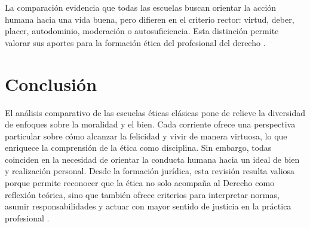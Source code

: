 \documentclass[
	spanish, %
	letterpaper, oneside
]{article}
\begin{document}
La comparación evidencia que todas las escuelas buscan orientar la acción humana hacia una vida buena, pero difieren en el criterio rector: virtud, deber, placer, autodominio, moderación o autosuficiencia. Esta distinción permite valorar sus aportes para la formación ética del profesional del derecho \citep{huerta2000etica,prieto2009favor}.


\section{Conclusión}

El análisis comparativo de las escuelas éticas clásicas pone de relieve la diversidad de enfoques sobre la moralidad y el bien. Cada corriente ofrece una perspectiva particular sobre cómo alcanzar la felicidad y vivir de manera virtuosa, lo que enriquece la comprensión de la ética como disciplina. Sin embargo, todas coinciden en la necesidad de orientar la conducta humana hacia un ideal de bien y realización personal. Desde la formación jurídica, esta revisión resulta valiosa porque permite reconocer que la ética no solo acompaña al Derecho como reflexión teórica, sino que también ofrece criterios para interpretar normas, asumir responsabilidades y actuar con mayor sentido de justicia en la práctica profesional \citep{ronquillo2018etica,huerta2000etica}.



\end{document}
